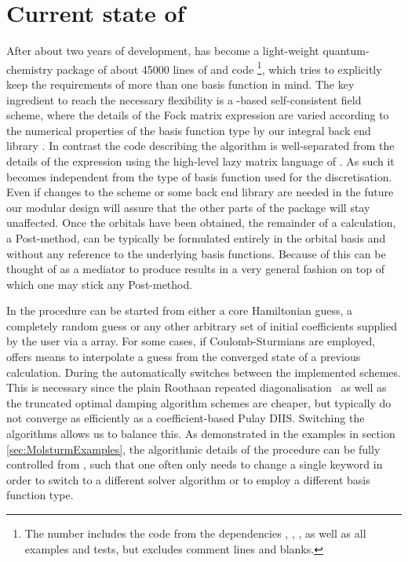 \section{Current state of \molsturm}
\label{sec:MolsturmState}

After about two years of development,
\molsturm has become a light-weight quantum-chemistry package of about 45000
lines of \cpp and \python code%
\footnote{The number includes the code from the dependencies
\gint, \gscf, \lazyten, \krims as well as
all examples and tests, but excludes comment lines and blanks.},
which tries to explicitly keep the requirements of more than
one basis function in mind.
The key ingredient to reach the necessary flexibility
is a \contraction-based self-consistent field scheme,
where the details of the Fock matrix \contraction expression
are varied according to the numerical properties of the basis function type
by our integral back end library \gint.
In contrast the code describing the \SCF algorithm
is well-separated from the details of the \contraction expression
using the high-level lazy matrix language of \lazyten.
As such it becomes independent from the type of basis function used for the discretisation.
Even if changes to the \SCF scheme or some back end
library are needed in the future our modular design
will assure that the other parts of the \molsturm package will stay unaffected.
Once the \SCF orbitals have been obtained,
the remainder of a calculation, \eg a Post-\HF method,
can be typically be formulated entirely in the \SCF orbital basis
and without any reference to the underlying basis functions.
Because of this \molsturm can be thought of as a mediator
to produce \SCF results in a very general fashion
on top of which one may stick any Post-\HF method.

In \molsturm the \SCF procedure can be started from either a core Hamiltonian guess,
a completely random guess or any other arbitrary set of initial
coefficients supplied by the user via a \numpy array.
For some cases, \eg if Coulomb-Sturmians are employed,
\molsturm offers means to interpolate a guess
from the converged state of a previous calculation.
During the \SCF \molsturm automatically switches between
the implemented \SCF schemes.
This is necessary since the plain Roothaan
repeated diagonalisation~\cite{Roothaan1951}
as well as the truncated optimal damping algorithm schemes
are cheaper, but typically do not converge as efficiently
as a coefficient-based Pulay DIIS.
Switching the algorithms allows us to balance this.
As demonstrated in the examples in section \ref{sec:MolsturmExamples},
the algorithmic details of the \SCF procedure can be fully controlled
from \python,
such that one often only needs to change a single keyword
in order to switch to a different solver algorithm
or to employ a different basis function type.

